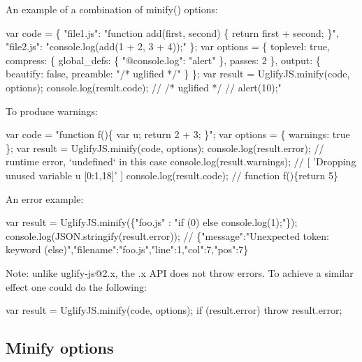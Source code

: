 An example of a combination of {\ttfamily minify()} options\+: 
\begin{DoxyCode}
var code = \{
    "file1.js": "function add(first, second) \{ return first + second; \}",
    "file2.js": "console.log(add(1 + 2, 3 + 4));"
\};
var options = \{
    toplevel: true,
    compress: \{
        global\_defs: \{
            "@console.log": "alert"
        \},
        passes: 2
    \},
    output: \{
        beautify: false,
        preamble: "/* uglified */"
    \}
\};
var result = UglifyJS.minify(code, options);
console.log(result.code);
// /* uglified */
// alert(10);"
\end{DoxyCode}


To produce warnings\+: 
\begin{DoxyCode}
var code = "function f()\{ var u; return 2 + 3; \}";
var options = \{ warnings: true \};
var result = UglifyJS.minify(code, options);
console.log(result.error);    // runtime error, `undefined` in this case
console.log(result.warnings); // [ 'Dropping unused variable u [0:1,18]' ]
console.log(result.code);     // function f()\{return 5\}
\end{DoxyCode}


An error example\+: 
\begin{DoxyCode}
var result = UglifyJS.minify(\{"foo.js" : "if (0) else console.log(1);"\});
console.log(JSON.stringify(result.error));
// \{"message":"Unexpected token: keyword (else)","filename":"foo.js","line":1,"col":7,"pos":7\}
\end{DoxyCode}
 Note\+: unlike {\ttfamily uglify-\/js@2.\+x}, the {.\+x} A\+PI does not throw errors. To achieve a similar effect one could do the following\+: 
\begin{DoxyCode}
var result = UglifyJS.minify(code, options);
if (result.error) throw result.error;
\end{DoxyCode}


\subsection*{Minify options}


